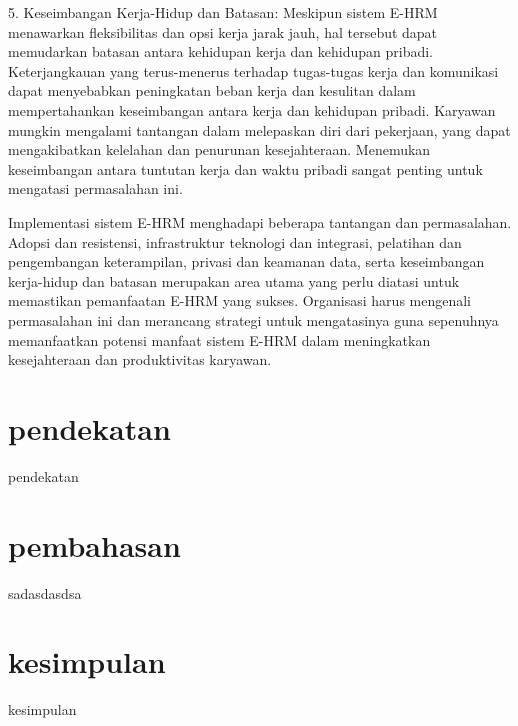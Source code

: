 \documentclass{article}
\begin{document}
5. Keseimbangan Kerja-Hidup dan Batasan:
Meskipun sistem E-HRM menawarkan fleksibilitas dan opsi kerja jarak jauh, hal tersebut dapat memudarkan batasan antara kehidupan kerja dan kehidupan pribadi. Keterjangkauan yang terus-menerus terhadap tugas-tugas kerja dan komunikasi dapat menyebabkan peningkatan beban kerja dan kesulitan dalam mempertahankan keseimbangan antara kerja dan kehidupan pribadi. Karyawan mungkin mengalami tantangan dalam melepaskan diri dari pekerjaan, yang dapat mengakibatkan kelelahan dan penurunan kesejahteraan. Menemukan keseimbangan antara tuntutan kerja dan waktu pribadi sangat penting untuk mengatasi permasalahan ini.\cite{al2018improving}

Implementasi sistem E-HRM menghadapi beberapa tantangan dan permasalahan. Adopsi dan resistensi, infrastruktur teknologi dan integrasi, pelatihan dan pengembangan keterampilan, privasi dan keamanan data, serta keseimbangan kerja-hidup dan batasan merupakan area utama yang perlu diatasi untuk memastikan pemanfaatan E-HRM yang sukses. Organisasi harus mengenali permasalahan ini dan merancang strategi untuk mengatasinya guna sepenuhnya memanfaatkan potensi manfaat sistem E-HRM dalam meningkatkan kesejahteraan dan produktivitas karyawan.
\section*{pendekatan}
pendekatan
\section*{pembahasan}
sadasdasdsa
\section*{kesimpulan}
kesimpulan

\end{document}
